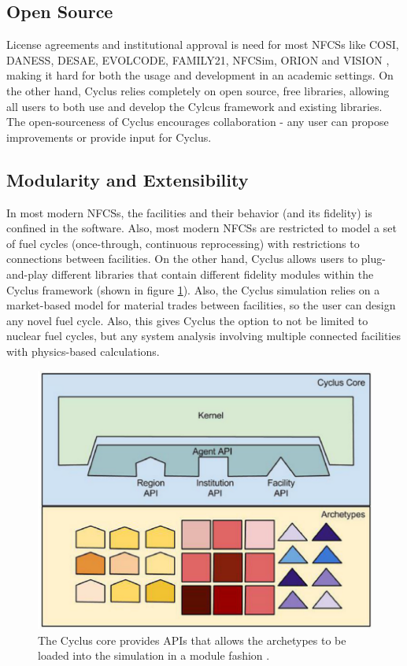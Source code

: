 \subsection{Open Source}
License agreements and institutional
approval is need for most \glspl{NFCS} like COSI, DANESS, DESAE, EVOLCODE,
FAMILY21, NFCSim, ORION and VISION \cite{juchau_modeling_2017}, making
it hard for both the usage and development in an academic settings.
On the other hand, Cyclus relies completely on open source,
free libraries, allowing all users to both use and develop the
Cylcus framework and existing libraries. The open-sourceness
of Cyclus encourages collaboration - any user can propose
improvements or provide input for Cyclus.

\subsection{Modularity and Extensibility}
In most modern \glspl{NFCS}, the facilities and their
behavior (and its fidelity) is confined in the software.
Also, most modern \glspl{NFCS} are restricted to model
a set of fuel cycles (once-through, continuous reprocessing)
with restrictions to connections between facilities. On the
other hand, Cyclus allows users to plug-and-play different libraries
that contain different fidelity modules within the Cyclus framework
(shown in figure \ref{fig:core}).
Also, the Cyclus simulation relies on a market-based model
for material trades between facilities, so the user can design
any novel fuel cycle. Also, this gives Cyclus the option to not
be limited to nuclear fuel cycles, but any system analysis
involving multiple connected facilities with physics-based
calculations.


\begin{figure}[htbp!]
	\begin{center}
		\includegraphics[scale=0.2]{./images/cyclus_core.png}
	\end{center}
	\caption{The Cyclus core provides APIs that allows the archetypes
			to be loaded into the simulation in a module fashion
			\cite{huff_fundamental_2016}.}
	\label{fig:core}
\end{figure}

